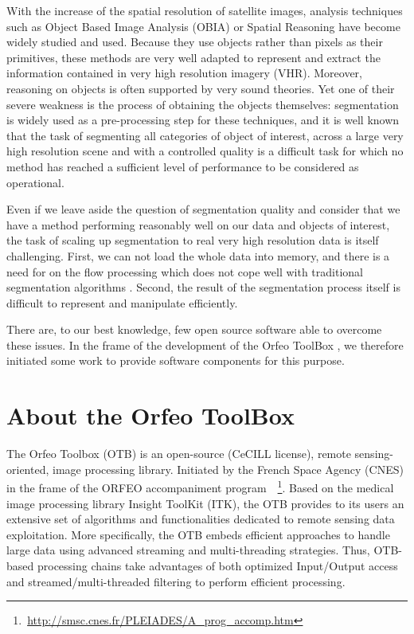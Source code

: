 \documentclass{josis}
\newcommand{\furl}[1]{    $\,$\footnote{$\,$\url{#1}}}
\begin{document}
With the increase of the spatial resolution of satellite images,
analysis techniques such as Object Based Image Analysis (OBIA) or Spatial
Reasoning \cite{inglada2009qualitative} have become widely studied and
used. Because they use objects rather than pixels as their primitives,
these methods are very well adapted to represent and extract the
information contained in very high resolution imagery (VHR). Moreover,
reasoning on objects is often supported by very sound theories. Yet
one of their severe weakness is the process of obtaining the objects
themselves: segmentation is widely used as a pre-processing step for
these techniques, and it is well known that the task of segmenting all
categories of object of interest, across a large very high resolution
scene and with a controlled quality is a difficult task for which no
method has reached a sufficient level of performance to be considered
as operational.

Even if we leave aside the question of segmentation quality and
consider that we have a method performing reasonably well on our data
and objects of interest, the task of scaling up segmentation to real
very high resolution data is itself challenging. First, we can not
load the whole data into memory, and there is a need for on the flow
processing which does not cope well with traditional segmentation
algorithms \cite{shi2000normalized}. Second, the result of the
segmentation process itself is difficult to represent and manipulate
efficiently.

There are, to our best knowledge, few open source software able to
overcome these issues. In the frame of the development of the Orfeo
ToolBox \cite{}, we therefore initiated some work to provide software
components for this purpose.

\section{About the Orfeo ToolBox}

The Orfeo Toolbox (OTB) is an open-source (CeCILL license), remote sensing-oriented, image processing library. Initiated by the French Space Agency (CNES) in the frame of the ORFEO accompaniment program~\furl{http://smsc.cnes.fr/PLEIADES/A_prog_accomp.htm}. Based on the medical image processing library Insight ToolKit (ITK), the OTB provides to its users an extensive set of algorithms and functionalities dedicated to remote sensing data exploitation. More specifically, the OTB embeds efficient approaches to handle large data using advanced streaming and multi-threading strategies. Thus, OTB-based processing chains take advantages of both optimized Input/Output access and streamed/multi-threaded filtering to perform efficient processing.
\end{document}

